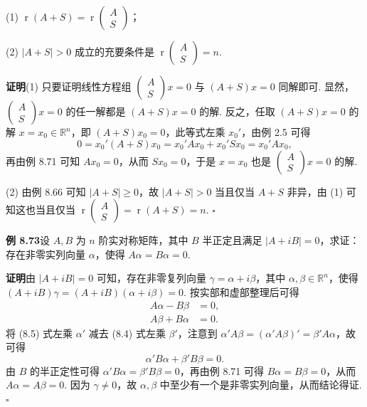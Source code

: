 \documentclass[UTF8, 12pt, fontset=fandol, oneside]{ctexart}
\begin{document}
(1) $\operatorname{r}(A+S)=\operatorname{r}\left(\begin{array}{c}A\\ S\end{array}\right)$；

(2) $|A+S|>0$ 成立的充要条件是 $\operatorname{r}\left(\begin{array}{c}A\\ S\end{array}\right)=n$.

\noindent\textbf{证明}\quad (1) 只要证明线性方程组 $\left(\begin{array}{c}A\\ S\end{array}\right)x=0$ 与 $(A+S)x=0$ 同解即可. 显然，$\left(\begin{array}{c}A\\ S\end{array}\right)x=0$ 的任一解都是 $(A+S)x=0$ 的解. 反之，任取 $(A+S)x=0$ 的解 $x=x_0\in\mathbb{R}^n$，即 $(A+S)x_0=0$，此等式左乘 $x_0'$，由例 2.5 可得
\[
0=x_0'(A+S)x_0=x_0'Ax_0+x_0'Sx_0=x_0'Ax_0,
\]
再由例 8.71 可知 $Ax_0=0$，从而 $Sx_0=0$，于是 $x=x_0$ 也是 $\left(\begin{array}{c}A\\ S\end{array}\right)x=0$ 的解.

(2) 由例 8.66 可知 $|A+S|\ge 0$，故 $|A+S|>0$ 当且仅当 $A+S$ 非异，由 (1) 可知这也当且仅当 $\operatorname{r}\left(\begin{array}{c}A\\ S\end{array}\right)=\operatorname{r}(A+S)=n$. $\ensuremath{\square}$

\noindent\textbf{例 8.73}\quad 设 $A,B$ 为 $n$ 阶实对称矩阵，其中 $B$ 半正定且满足 $|A+iB|=0$，求证：存在非零实列向量 $\alpha$，使得 $A\alpha=B\alpha=0$.

\noindent\textbf{证明}\quad 由 $|A+iB|=0$ 可知，存在非零复列向量 $\gamma=\alpha+i\beta$，其中 $\alpha,\beta\in\mathbb{R}^n$，使得 $(A+iB)\gamma=(A+iB)(\alpha+i\beta)=0$. 按实部和虚部整理后可得
\begin{align}
A\alpha-B\beta&=0,\tag{8.4}\\
A\beta+B\alpha&=0.\tag{8.5}
\end{align}
将 (8.5) 式左乘 $\alpha'$ 减去 (8.4) 式左乘 $\beta'$，注意到 $\alpha'A\beta=(\alpha'A\beta)'=\beta'A\alpha$，故可得
\[
\alpha'B\alpha+\beta'B\beta=0.
\]
由 $B$ 的半正定性可得 $\alpha'B\alpha=\beta'B\beta=0$，再由例 8.71 可得 $B\alpha=B\beta=0$，从而 $A\alpha=A\beta=0$. 因为 $\gamma\ne 0$，故 $\alpha,\beta$ 中至少有一个是非零实列向量，从而结论得证. $\ensuremath{\square}$
\end{document}
